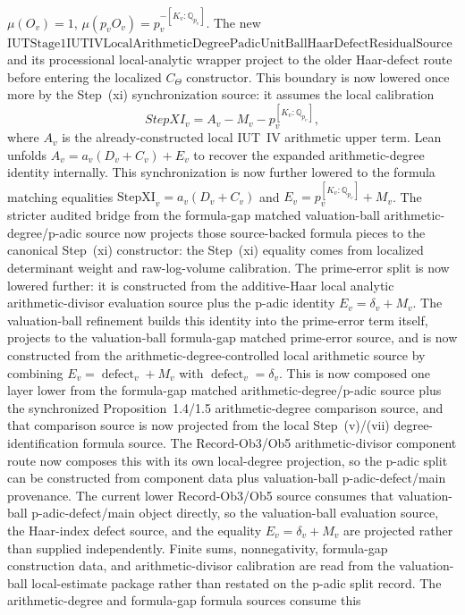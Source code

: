 \documentclass[11pt]{article}
\theoremstyle{plain}
\theoremstyle{definition}
\theoremstyle{remark}
\begin{document}
\(\mu(O_v)=1\), \(\mu(p_vO_v)=p_v^{-[K_v:\mathbb{Q}_{p_v}]}\).  The new
\(\mathrm{IUTStage1IUTIVLocalArithmeticDegreePadicUnitBallHaarDefectResidualSource}\)
and its processional local-analytic wrapper project to the older Haar-defect
route before entering the localized \(C_\Theta\) constructor.  This boundary is
now lowered once more by the Step~(xi) synchronization source: it assumes the
local calibration
\[
  StepXI_v=A_v-M_v-p_v^{[K_v:\mathbb{Q}_{p_v}]},
\]
where \(A_v\) is the already-constructed local IUT~IV arithmetic upper term.
Lean unfolds \(A_v=a_v(D_v+C_v)+E_v\) to recover the expanded
arithmetic-degree identity internally.  This synchronization is now further
lowered to the formula matching equalities
\(\mathrm{StepXI}_v=a_v(D_v+C_v)\) and
\(E_v=p_v^{[K_v:\mathbb Q_{p_v}]}+M_v\).  The stricter audited bridge from the
formula-gap matched valuation-ball arithmetic-degree/p-adic source now projects
those source-backed formula pieces to the canonical Step~(xi) constructor: the
Step~(xi) equality comes from localized determinant weight and raw-log-volume
calibration.  The prime-error split is now lowered further: it is constructed
from the additive-Haar local analytic arithmetic-divisor evaluation source plus
the p-adic identity \(E_v=\delta_v+M_v\).  The valuation-ball refinement builds
this identity into the prime-error term itself, projects to the valuation-ball
formula-gap matched prime-error source, and is now constructed from the
arithmetic-degree-controlled local arithmetic source by combining
\(E_v=\operatorname{defect}_v+M_v\) with
\(\operatorname{defect}_v=\delta_v\).  This is now composed one layer lower
from the formula-gap matched arithmetic-degree/p-adic source plus the
synchronized Proposition~1.4/1.5 arithmetic-degree comparison source, and that
comparison source is now projected from the local Step~(v)/(vii)
degree-identification formula source.  The Record-Ob3/Ob5 arithmetic-divisor
component route now composes this with its own local-degree projection, so the
p-adic split can be constructed from component data plus valuation-ball
p-adic-defect/main provenance.  The current lower Record-Ob3/Ob5 source consumes that
valuation-ball p-adic-defect/main object directly, so the valuation-ball
evaluation source, the Haar-index defect source, and the equality
\(E_v=\delta_v+M_v\) are projected rather than supplied independently.
Finite sums, nonnegativity, formula-gap
construction data, and arithmetic-divisor calibration are read from the
valuation-ball local-estimate package rather than restated on the p-adic split
record.  The arithmetic-degree and formula-gap formula sources consume this
\end{document}

